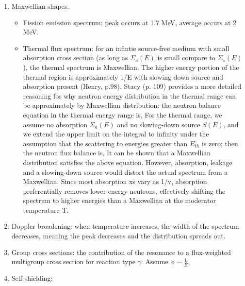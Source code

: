 \documentclass{school-22.211-notes}
\begin{document}
\begin{enumerate}
\item Maxwellian shapes.
  \begin{itemize}
  \item Fission emission spectrum: peak occurs at 1.7 MeV, average occurs at 2 MeV.
  \item Thermal flux spectrum: for an infintie source-free medium with small absorption cross section (as long as $\Sigma_a(E)$ is small compare to $\Sigma_s(E)$), the thermal spectrum is Maxwellian. The higher energy portion of the thermal region is approximately 1/E with slowing down source and absorption present (Henry, p.98). Stacy (p. 109) provides a more detailed reasoning for why neutron energy distribution in the thermal range can be approximately by Maxwellian distribution: the neutron balance equation in the thermal energy range is, 
    For the thermal range, we assume no absorption $\Sigma_a(E)$ and no slowing-down source $S(E)$, and we extend the upper limit on the integral to infinity under the assumption that the scattering to energies greater than $E_{th}$ is zero; then the neutron flux balance is,
   It can be shown that a Maxwellian distribution satisfies the above equation. However, absorption, leakage and a slowing-down source would distort the actual spectrum from a Maxwellian. Since most absorption xs vary as 1/v, absorption preferentially removes lower-energy neutrons, effectively shifting the spectrum to higher energies than a Maxwellian at the moderator temperature T. 
  \end{itemize}

\item Doppler broadening: when temperature increases, the width of the spectrum decreases, meaning the peak decreases and the distribution spreads out. 
  
\item Group cross sections: the contribution of the resonance to a flux-weighted multigroup cross section for reaction type $\gamma$:
  Assume $\phi \sim \frac{1}{E}$,
 
\item Self-shielding: 


\end{enumerate}
\end{document}
